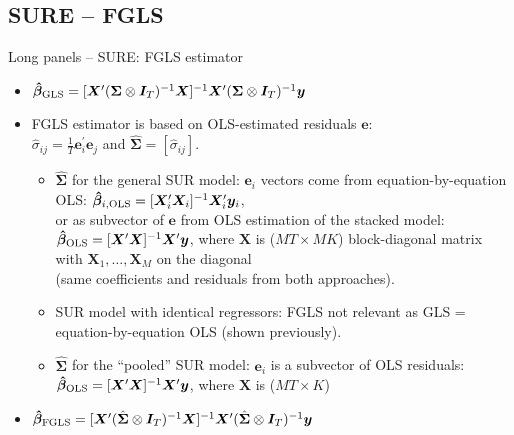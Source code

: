\documentclass[usenames,dvipsnames]{beamer}
\begin{document}
\subsection*{SURE -- FGLS}
\begin{frame}{Long panels -- SURE: FGLS estimator}
\small
\begin{itemize}
    \item $\bm{\hat{\beta}}_{\textnormal{GLS}} = [\bm{X}^{\prime} (\bm{\Sigma} \otimes \bm{I}_T)^{-1} \bm{X}]^{-1} \bm{X}^{\prime} (\bm{\Sigma} \otimes \bm{I}_T)^{-1} \bm{y}$ \\ \bigskip
    \item FGLS estimator is based on OLS-estimated residuals $\bm{e}$:\\ \bigskip
    $\hat{\sigma}_{ij} = \frac{1}{T}\bm{e}_i^{\prime}\bm{e}_j$ \quad and \quad $\hat{\bm{\Sigma}}=[\hat{\sigma}_{ij}]$. \medskip
    \begin{itemize}
        \item $\hat{\bm{\Sigma}}$ for the general SUR model:  $\bm{e}_i$ vectors come from equation-by-equation OLS: 
        $\bm{\hat{\beta}}_{i,\textnormal{OLS}} = [\bm{X}_i^{\prime}\bm{X}_i]^{-1} \bm{X}_i^{\prime} \bm{y}_i$,\\ or as subvector of $\bm{e}$ from OLS estimation of the stacked model: $\bm{\hat{\beta}}_{\textnormal{OLS}} = [\bm{X}^{\prime}\bm{X}]^{-1} \bm{X}^{\prime} \bm{y}$, where $\bm{X}$ is ($MT \times MK$) block-diagonal matrix with $\bm{X}_1,\dots,\bm{X}_M$ on the diagonal \\
        (same coefficients and residuals from both approaches). \medskip
        \item SUR model with identical regressors: FGLS not relevant as GLS = equation-by-equation OLS (shown previously). \\ \medskip
        \item $\hat{\bm{\Sigma}}$ for the ``pooled'' SUR model: 
        $\bm{e}_i$ is a subvector of OLS residuals: 
        $\bm{\hat{\beta}}_{\textnormal{OLS}} = [\bm{X}^{\prime}\bm{X}]^{-1} \bm{X}^{\prime} \bm{y}$, where $\bm{X}$ is ($MT \times K$) \medskip
    \end{itemize}
    \item $\bm{\hat{\beta}}_{\textnormal{FGLS}} = [\bm{X}^{\prime} (\hat{\bm{\Sigma}} \otimes \bm{I}_T)^{-1} \bm{X}]^{-1} \bm{X}^{\prime} (\hat{\bm{\Sigma}} \otimes \bm{I}_T)^{-1} \bm{y}$
\end{itemize}
\end{frame}
\end{document}
